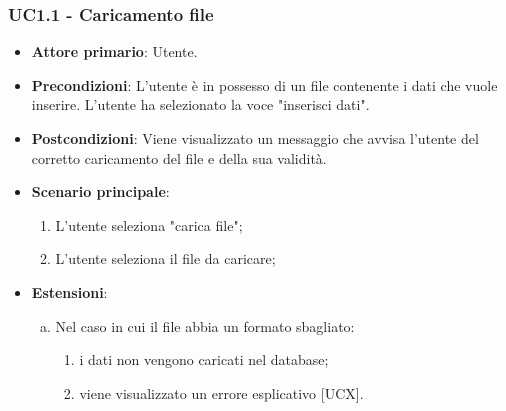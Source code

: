\subsubsection{UC1.1 - Caricamento file}
\begin{itemize}
	\item \textbf{Attore primario}: Utente.
	\item \textbf{Precondizioni}: L'utente è in possesso di un file contenente i dati che vuole inserire. L'utente ha selezionato la voce "inserisci dati".
	\item \textbf{Postcondizioni}: Viene visualizzato un messaggio che avvisa l'utente del corretto caricamento del file e della sua validità.
	\item \textbf{Scenario principale}:
	\begin{enumerate}
		\item L'utente seleziona "carica file";
		\item L'utente seleziona il file da caricare;
	\end{enumerate}
	\item \textbf{Estensioni}:
	\begin{enumerate}[(a)]
		\item Nel caso in cui il file abbia un formato sbagliato:
		\begin{enumerate}[1.]
			\item i dati non vengono caricati nel database;
			\item viene visualizzato un errore esplicativo [UCX].
		\end{enumerate}
	\end{enumerate}
\end{itemize}